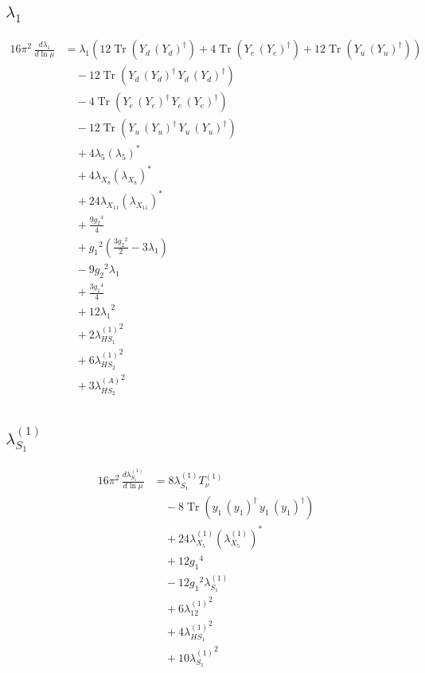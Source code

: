 \documentclass[10pt,a4paper]{article}
\begin{document}
\subsection*{$\lambda_1$}
\begin{align*}
16\pi^2\,\frac{d \lambda_1}{d\ln\mu} &={\lambda_1} (12 \operatorname{Tr}\!\left({Y_d}\,\left({Y_d}\right)^{\dagger}\right)+4 \operatorname{Tr}\!\left({Y_e}\,\left({Y_e}\right)^{\dagger}\right)+12 \operatorname{Tr}\!\left({Y_u}\,\left({Y_u}\right)^{\dagger}\right)) \\
&\quad -12 \operatorname{Tr}\!\left({Y_d}\,\left({Y_d}\right)^{\dagger}\,{Y_d}\,\left({Y_d}\right)^{\dagger}\right) \\
&\quad -4 \operatorname{Tr}\!\left({Y_e}\,\left({Y_e}\right)^{\dagger}\,{Y_e}\,\left({Y_e}\right)^{\dagger}\right) \\
&\quad -12 \operatorname{Tr}\!\left({Y_u}\,\left({Y_u}\right)^{\dagger}\,{Y_u}\,\left({Y_u}\right)^{\dagger}\right) \\
&\quad +4 {\lambda_5} \left({\lambda_5}\right)^{*} \\
&\quad +4 {\lambda_{X_{8}}} \left({\lambda_{X_{8}}}\right)^{*} \\
&\quad +24 {\lambda_{X_{11}}} \left({\lambda_{X_{11}}}\right)^{*} \\
&\quad +\frac{9 {g_2}^4}{4} \\
&\quad +{g_1}^2 \left(\frac{3 {g_2}^2}{2}-3 {\lambda_1}\right) \\
&\quad -9 {g_2}^2 {\lambda_1} \\
&\quad +\frac{3 {g_1}^4}{4} \\
&\quad +12 {\lambda_1}^2 \\
&\quad +2 {\lambda_{HS_1}^{(1)}}^2 \\
&\quad +6 {\lambda_{HS_2}^{(1)}}^2 \\
&\quad +3 {\lambda_{HS_2}^{(A)}}^2 \\
\end{align*}
\subsection*{$\lambda_{S_1}^{(1)}$}
\begin{align*}
16\pi^2\,\frac{d \lambda_{S_1}^{(1)}}{d\ln\mu} &=8 {\lambda_{S_1}^{(1)}} T_{\nu}^{(1)} \\
&\quad -8 \operatorname{Tr}\!\left({y_1}\,\left({y_1}\right)^{\dagger}\,{y_1}\,\left({y_1}\right)^{\dagger}\right) \\
&\quad +24 {\lambda_{X_{5}}^{(1)}} \left({\lambda_{X_{5}}^{(1)}}\right)^{*} \\
&\quad +12 {g_1}^4 \\
&\quad -12 {g_1}^2 {\lambda_{S_1}^{(1)}} \\
&\quad +6 {\lambda_{12}^{(1)}}^2 \\
&\quad +4 {\lambda_{HS_1}^{(1)}}^2 \\
&\quad +10 {\lambda_{S_1}^{(1)}}^2 \\
\end{align*}
\end{document}
